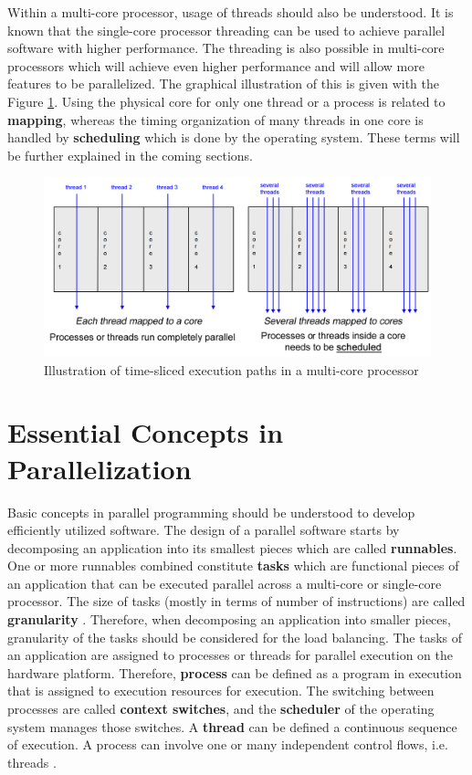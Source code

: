 Within a multi-core processor, usage of threads should also be understood. It is known that the single-core processor threading can be used to achieve parallel software with higher performance. The threading is also possible in multi-core processors which will achieve even higher performance and will allow more features to be parallelized. The graphical illustration of this is given with the Figure \ref{fig:differentthreading}. Using the physical core for only one thread or a process is related to \textbf{mapping}, whereas the timing organization of many threads in one core is handled by \textbf{scheduling} which is done by the operating system. These terms will be further explained in the coming sections.

\begin{figure}[!ht]
	\centering
	\captionsetup{justification=centering}
	\includegraphics[width=\textwidth]{content/images/differentthreading.png}
	\caption{Illustration of time-sliced execution paths in a multi-core processor \cite{multicore1}}
	\label{fig:differentthreading}
\end{figure}

\section{Essential Concepts in Parallelization} 

Basic concepts in parallel programming should be understood to develop efficiently utilized software. The design of a parallel software starts by decomposing an application into its smallest pieces which are called \textbf{runnables}. One or more runnables combined constitute \textbf{tasks} which are functional pieces of an application that can be executed parallel across a multi-core or single-core processor. The size of tasks (mostly in terms of number of instructions) are called \textbf{granularity} \cite{springerparallel}. Therefore, when decomposing an application into smaller pieces, granularity of the tasks should be considered for the load balancing. The tasks of an application are assigned to processes or threads for parallel execution on the hardware platform. Therefore, \textbf{process} can be defined as a program in execution that is assigned to execution resources for execution. The switching between processes are called \textbf{context switches}, and the \textbf{scheduler} of the operating system manages those switches. A \textbf{thread} can be defined a continuous sequence of execution. A process can involve one or many independent control flows, i.e. threads \cite{springerparallel}. 


